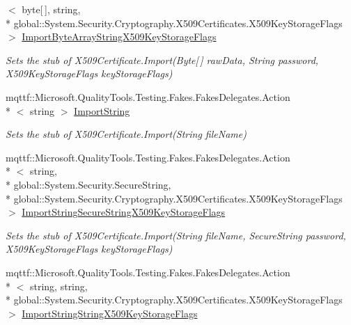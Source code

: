 \begin{DoxyCompactItemize}
$<$ byte\mbox{[}$\,$\mbox{]}, string, \\*
global\-::\-System.\-Security.\-Cryptography.\-X509\-Certificates.\-X509\-Key\-Storage\-Flags $>$ \hyperlink{class_system_1_1_security_1_1_cryptography_1_1_x509_certificates_1_1_fakes_1_1_stub_x509_certificate_a98ec1a6e28720740abac545456dc5910}{Import\-Byte\-Array\-String\-X509\-Key\-Storage\-Flags}
\begin{DoxyCompactList}\small\item\em Sets the stub of X509\-Certificate.\-Import(\-Byte\mbox{[}$\,$\mbox{]} raw\-Data, String password, X509\-Key\-Storage\-Flags key\-Storage\-Flags)\end{DoxyCompactList}\item 
mqttf\-::\-Microsoft.\-Quality\-Tools.\-Testing.\-Fakes.\-Fakes\-Delegates.\-Action\\*
$<$ string $>$ \hyperlink{class_system_1_1_security_1_1_cryptography_1_1_x509_certificates_1_1_fakes_1_1_stub_x509_certificate_afc330570343b4b8f0bace8ff962d4156}{Import\-String}
\begin{DoxyCompactList}\small\item\em Sets the stub of X509\-Certificate.\-Import(\-String file\-Name)\end{DoxyCompactList}\item 
mqttf\-::\-Microsoft.\-Quality\-Tools.\-Testing.\-Fakes.\-Fakes\-Delegates.\-Action\\*
$<$ string, \\*
global\-::\-System.\-Security.\-Secure\-String, \\*
global\-::\-System.\-Security.\-Cryptography.\-X509\-Certificates.\-X509\-Key\-Storage\-Flags $>$ \hyperlink{class_system_1_1_security_1_1_cryptography_1_1_x509_certificates_1_1_fakes_1_1_stub_x509_certificate_a31f005d0ddc52edb413877f147101d3a}{Import\-String\-Secure\-String\-X509\-Key\-Storage\-Flags}
\begin{DoxyCompactList}\small\item\em Sets the stub of X509\-Certificate.\-Import(\-String file\-Name, Secure\-String password, X509\-Key\-Storage\-Flags key\-Storage\-Flags)\end{DoxyCompactList}\item 
mqttf\-::\-Microsoft.\-Quality\-Tools.\-Testing.\-Fakes.\-Fakes\-Delegates.\-Action\\*
$<$ string, string, \\*
global\-::\-System.\-Security.\-Cryptography.\-X509\-Certificates.\-X509\-Key\-Storage\-Flags $>$ \hyperlink{class_system_1_1_security_1_1_cryptography_1_1_x509_certificates_1_1_fakes_1_1_stub_x509_certificate_a76451a4f7da5fd6a9dd9836136ab60f6}{Import\-String\-String\-X509\-Key\-Storage\-Flags}

\end{DoxyCompactItemize}

